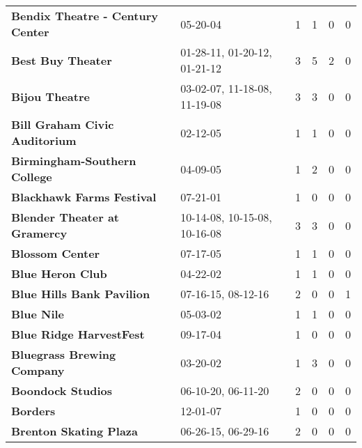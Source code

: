 \begin{supertabular}{llllll}
                             \textbf{Bendix Theatre - Century Center} &                      05-20-04 &  1 &   1 &  0 &  0 \\
                                            \textbf{Best Buy Theater} &  01-28-11, 01-20-12, 01-21-12 &  3 &   5 &  2 &  0 \\
                                               \textbf{Bijou Theatre} &  03-02-07, 11-18-08, 11-19-08 &  3 &   3 &  0 &  0 \\
                                \textbf{Bill Graham Civic Auditorium} &                      02-12-05 &  1 &   1 &  0 &  0 \\
                                 \textbf{Birmingham-Southern College} &                      04-09-05 &  1 &   2 &  0 &  0 \\
                                    \textbf{Blackhawk Farms Festival} &                      07-21-01 &  1 &   0 &  0 &  0 \\
                                 \textbf{Blender Theater at Gramercy} &  10-14-08, 10-15-08, 10-16-08 &  3 &   3 &  0 &  0 \\
                                              \textbf{Blossom Center} &                      07-17-05 &  1 &   1 &  0 &  0 \\
                                             \textbf{Blue Heron Club} &                      04-22-02 &  1 &   1 &  0 &  0 \\
                                    \textbf{Blue Hills Bank Pavilion} &            07-16-15, 08-12-16 &  2 &   0 &  0 &  1 \\
                                                   \textbf{Blue Nile} &                      05-03-02 &  1 &   1 &  0 &  0 \\
                                      \textbf{Blue Ridge HarvestFest} &                      09-17-04 &  1 &   0 &  0 &  0 \\
                                   \textbf{Bluegrass Brewing Company} &                      03-20-02 &  1 &   3 &  0 &  0 \\
                                            \textbf{Boondock Studios} &            06-10-20, 06-11-20 &  2 &   0 &  0 &  0 \\
                                                     \textbf{Borders} &                      12-01-07 &  1 &   0 &  0 &  0 \\
                                       \textbf{Brenton Skating Plaza} &            06-26-15, 06-29-16 &  2 &   0 &  0 &  0 \\

\end{supertabular}
